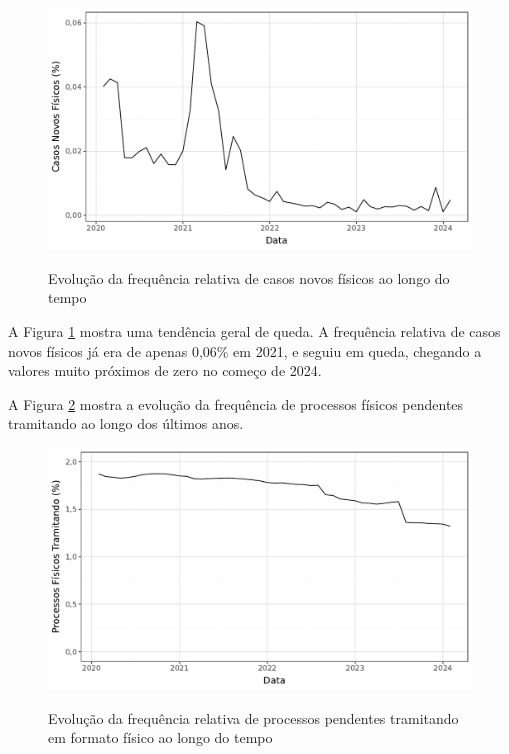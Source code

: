 \begin{figure}[H]
    \centering
    \caption{Evolução da frequência relativa de casos novos físicos ao longo do tempo}
    \includegraphics[scale=.87]{imagens/pct_fisicos_tempo.pdf}
    \label{fig:pct_fisicos_tempo}
\end{figure}

A Figura \ref{fig:pct_fisicos_tempo} mostra uma tendência geral de queda. A frequência relativa de casos novos físicos já era de apenas 0,06\% em 2021, e seguiu em queda, chegando a valores muito próximos de zero no começo de 2024.

A Figura \ref{fig:pct_fisicos_tramitando_tempo} mostra a evolução da frequência de processos físicos pendentes tramitando ao longo dos últimos anos.

\begin{figure}[H]
    \centering
    \caption{Evolução da frequência relativa de processos pendentes tramitando em formato físico ao longo do tempo}
    \includegraphics[scale=.85]{imagens/pct_fisicos_tramitando_tempo.pdf}
    \label{fig:pct_fisicos_tramitando_tempo}
\end{figure}

